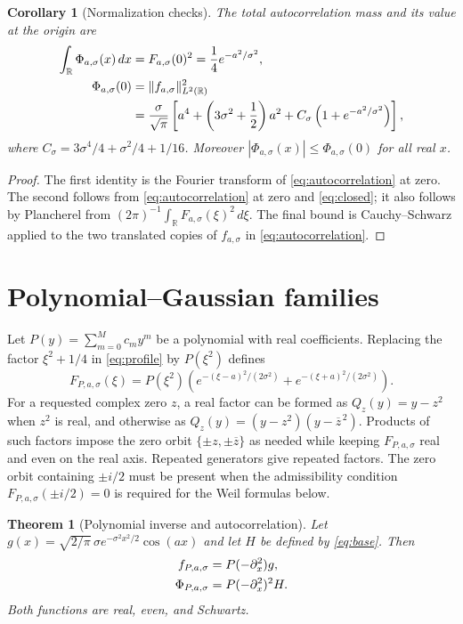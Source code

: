 \documentclass[11pt]{article}
\newtheorem{theorem}{Theorem}
\newtheorem{corollary}{Corollary}
\newcommand{\R}{\mathbb{R}}
\newcommand{\PhiA}{\Phi_{a,\sigma}}
\begin{document}
\begin{corollary}[Normalization checks]\label{cor:checks}
The total autocorrelation mass and its value at the origin are
\begin{align}\label{eq:mass}
  \int_{\R}\PhiA(x)\,dx
  &=F_{a,\sigma}(0)^2
   =\frac14 e^{-a^2/\sigma^2},\\
  \PhiA(0)
  &=\|f_{a,\sigma}\|_{L^2(\R)}^2\notag\\
  &=\frac{\sigma}{\sqrt\pi}
    \left[
      a^4+\left(3\sigma^2+\frac12\right)a^2
      +C_\sigma\left(1+e^{-a^2/\sigma^2}\right)
    \right],\label{eq:at-zero}
\end{align}
where $C_\sigma=3\sigma^4/4+\sigma^2/4+1/16$.
Moreover $|\PhiA(x)|\leq\PhiA(0)$ for all real $x$.
\end{corollary}

\begin{proof}
The first identity is the Fourier transform of \eqref{eq:autocorrelation}
at zero. The second follows from \eqref{eq:autocorrelation} at zero
and \eqref{eq:closed}; it also follows by Plancherel from
$(2\pi)^{-1}\int_{\R}F_{a,\sigma}(\xi)^2\,d\xi$.
The final bound is Cauchy--Schwarz applied to the two translated copies
of $f_{a,\sigma}$ in \eqref{eq:autocorrelation}.
\end{proof}

\section{Polynomial--Gaussian families}

Let $P(y)=\sum_{m=0}^{M}c_m y^m$ be a polynomial with real
coefficients. Replacing the factor $\xi^2+1/4$ in
\eqref{eq:profile} by $P(\xi^2)$ defines
\begin{equation}\label{eq:poly-family}
 F_{P,a,\sigma}(\xi)=P(\xi^2)
 \left(e^{-(\xi-a)^2/(2\sigma^2)}
       +e^{-(\xi+a)^2/(2\sigma^2)}\right).
\end{equation}
For a requested complex zero $z$, a real factor can be formed as
$Q_z(y)=y-z^2$ when $z^2$ is real, and otherwise as
$Q_z(y)=(y-z^2)(y-\overline z^{\,2})$.
Products of such factors impose the zero orbit
$\{\pm z,\pm\overline z\}$ as needed while keeping
$F_{P,a,\sigma}$ real and even on the real axis. Repeated generators
give repeated factors. The zero orbit containing $\pm i/2$ must be present
when the admissibility condition $F_{P,a,\sigma}(\pm i/2)=0$ is required
for the Weil formulas below.

\begin{theorem}[Polynomial inverse and autocorrelation]\label{thm:poly}
Let $g(x)=\sqrt{2/\pi}\,\sigma e^{-\sigma^2x^2/2}\cos(ax)$ and let
$H$ be defined by \eqref{eq:base}. Then
\begin{align}\label{eq:poly-operators}
 f_{P,a,\sigma}&=P(-\partial_x^2)g,\\
 \Phi_{P,a,\sigma}&=P(-\partial_x^2)^2H.\notag
\end{align}
Both functions are real, even, and Schwartz.
\end{theorem}
\end{document}
